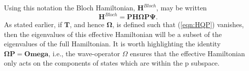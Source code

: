 \documentclass[12pt]{article}
\begin{document}
Using this notation the Bloch Hamiltonian, $\mathbf{H}^{Bloch}$, may be written
\begin{equation}
\mathbf{H}^{Bloch} = \mathbf{P}\mathbf{H}\boldsymbol{\Omega}\mathbf{P}\mathbf{\Psi}.
\label{eqn:effective_Bloch}
\end{equation}
As stated earlier, if $\mathbf{T}$, and hence $\boldsymbol{\Omega}$, is defined such that (\ref{eqn:HQP}) vanishes,
then the eigenvalues of this effective Hamiltonian will be a subset of the eigenvalues of the full Hamiltonian. 
It is worth highlighting the identity $\boldsymbol{\Omega}\mathbf{P} = \boldsymbol{Omega}$, i.e., 
the wave-operator $\Omega$ ensures that the effective Hamiltonian only acts on the components of states which are 
within the $\mathrm{p}$ subspace. \\
\end{document}
